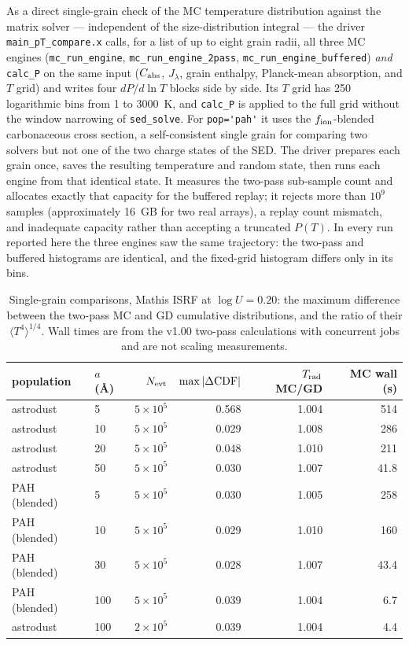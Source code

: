 \documentclass{my_memo}
\newcommand{\Cabs}{C_{\rm abs}}
\newcommand{\evt}{N_{\rm evt}}
\begin{document}
As a direct single-grain check of the MC temperature distribution
against the matrix solver --- independent of the size-distribution
integral --- the driver \verb|main_pT_compare.x| calls, for a list of
up to eight grain radii, all three MC engines
(\verb|mc_run_engine|, \verb|mc_run_engine_2pass|,
\verb|mc_run_engine_buffered|) \emph{and} \verb|calc_P| on the same
input ($\Cabs$, $J_\lambda$, grain enthalpy, Planck-mean
absorption, and $T$ grid) and writes four $dP/d\ln T$ blocks side by
side. Its $T$ grid has 250 logarithmic bins from 1 to 3000~K, and
\verb|calc_P| is applied to the full grid without the window narrowing
of \verb|sed_solve|. For \verb|pop='pah'| it uses the
$f_{\rm ion}$-blended carbonaceous cross section, a self-consistent
single grain for comparing two solvers but not one of the two charge
states of the SED. The driver prepares each grain once, saves the
resulting temperature and random state, then runs each engine from
that identical state. It measures the two-pass sub-sample count and
allocates exactly that capacity for the buffered replay; it rejects
more than $10^9$ samples (approximately 16~GB for two real arrays), a
replay count mismatch, and inadequate capacity rather than accepting a
truncated $P(T)$. In every run reported here the three engines saw
the same trajectory: the two-pass and buffered histograms are
identical, and the fixed-grid histogram differs only in its bins.

\begin{table}[ht]
\centering
\caption{Single-grain comparisons, Mathis ISRF at $\log U=0.20$: the
  maximum difference between the two-pass MC and GD cumulative
  distributions, and the ratio of their $\langle T^4\rangle^{1/4}$.
  Wall times are from the v1.00 two-pass calculations with concurrent
  jobs and are not scaling measurements.}
\label{tab:pt}
\begin{tabular}{llrrrr}
\toprule
population & $a$ (\AA) & $\evt$ & $\max|\Delta{\rm CDF}|$ & $T_{\rm rad}$ MC/GD & MC wall (s) \\
\midrule
astrodust & 5   & $5\times10^5$ & 0.568 & 1.004 & 514 \\
astrodust & 10  & $5\times10^5$ & 0.029 & 1.008 & 286 \\
astrodust & 20  & $5\times10^5$ & 0.048 & 1.010 & 211 \\
astrodust & 50  & $5\times10^5$ & 0.030 & 1.007 & 41.8 \\
PAH (blended) & 5   & $5\times10^5$ & 0.030 & 1.005 & 258 \\
PAH (blended) & 10  & $5\times10^5$ & 0.029 & 1.010 & 160 \\
PAH (blended) & 30  & $5\times10^5$ & 0.028 & 1.007 & 43.4 \\
PAH (blended) & 100 & $5\times10^5$ & 0.039 & 1.004 & 6.7 \\
astrodust & 100 & $2\times10^5$ & 0.039 & 1.004 & 4.4 \\
\bottomrule
\end{tabular}
\end{table}
\end{document}
